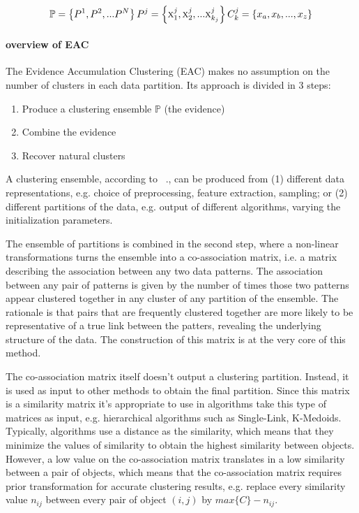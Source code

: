$$
\mathbb{P} = \left \{   P^1, P^2, ... P^N   \right \} \\
P^j = \left \{   \textsc{x}^j_1, \textsc{x}^j_2, ... \textsc{x}^{j}_{k_j}   \right \} \\
C^j_k = \left \{   x_a, x_b, ..., x_z   \right \}
$$

\paragraph{overview of EAC} 
The Evidence Accumulation Clustering (EAC) makes no assumption on the number of clusters in each data partition. Its approach is divided in 3 steps:

\begin{enumerate}
\item Produce a clustering ensemble $\mathbb{P}$ (the evidence)
\item Combine the evidence
\item Recover natural clusters 
\end{enumerate}

A clustering ensemble, according to ~\cite{Fred2005}., can be produced from (1) different data representations, e.g. choice of preprocessing, feature extraction, sampling; or (2) different partitions of the data, e.g. output of different algorithms, varying the initialization parameters.

The ensemble of partitions is combined in the second step, where a non-linear transformations turns the ensemble into a co-association matrix, i.e. a matrix describing the association between any two data patterns. The association between any pair of patterns is given by the number of times those two patterns appear clustered together in any cluster of any partition of the ensemble. The rationale is that pairs that are frequently clustered together are more likely to be representative of a true link between the patters, revealing the underlying structure of the data.
The construction of this matrix is at the very core of this method.

The co-association matrix itself doesn't output a clustering partition. Instead, it is used as input to other methods to obtain the final partition. Since this matrix is a similarity matrix it's appropriate to use in algorithms take this type of matrices as input, e.g. hierarchical algorithms such as Single-Link, K-Medoids. Typically, algorithms use a distance as the similarity, which means that they minimize the values of similarity to obtain the highest similarity between objects. However, a low value on the co-association matrix translates in a low similarity between a pair of objects, which means that the co-association matrix requires prior transformation for accurate clustering results, e.g. replace every similarity value $n_{ij}$ between every pair of object $(i,j)$ by $max \{ C \} - n_{ij}$.


